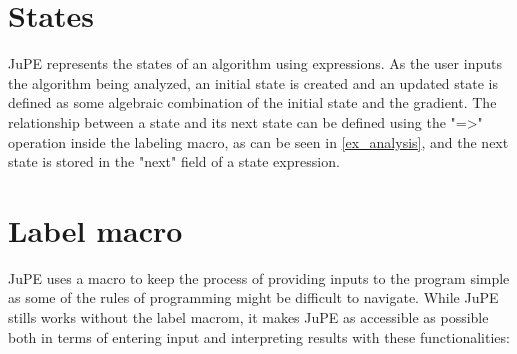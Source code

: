 \section{States}
JuPE represents the states of an algorithm using expressions. As the user inputs the algorithm being analyzed, an initial state is created and an updated state is defined as some algebraic combination of the initial state and the gradient. The relationship between a state and its next state can be defined using the "=>" operation inside the labeling macro, as can be seen in \ref{ex_analysis}, and the next state is stored in the "next" field of a state expression.

\section{Label macro}
JuPE uses a macro to keep the process of providing inputs to the program simple as some of the  rules of programming might be difficult to navigate. While JuPE stills works without the label macrom, it makes JuPE as accessible as possible both in terms of entering input and interpreting results with these functionalities:
